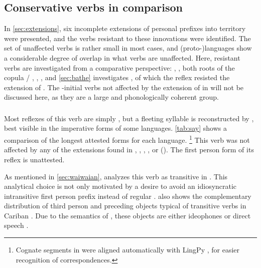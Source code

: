 \subsection{Conservative verbs in comparison}
\label{sec:verbs}
In \cref{sec:extensions}, six incomplete extensions of personal prefixes into  territory were presented, and the verbs resistant to these innovations were identified.
The set of unaffected verbs is rather small in most cases, and (proto-)languages show a considerable degree of overlap in what verbs are unaffected.
Here,  resistant verbs are investigated from a comparative perspective:
  ,   , both roots of the copula / ,   ,    , and  \cref{sec:bathe} investigates  , of which the \PPek reflex  resisted the extension of .
The -initial verbs not affected by the extension of  in \akuriyo {} will not be discussed here, as they are a large and phonologically coherent group.

\subsubsection{ }
\label{sec:say}
Most reflexes of this verb are simply , but a fleeting syllable  is reconstructed by \textcite{gildea2007greenberg}, best visible in the imperative forms of some languages.%
%
%
\cref{tab:say} shows a comparison of the longest attested forms for each language.%
\footnote{Cognate segments in  were aligned automatically with LingPy \parencite{lingpy268}, for easier recognition of correspondences.}
%
%
%
This verb was not affected by any of the extensions found in \PPek, \PWai, \PTir, \akuriyo, or \carijo ().
The first person form of its \yukpa reflex  is unattested.

As mentioned in \cref{sec:waiwaian}, \textcite{hixkaryanaderby1985} analyzes this verb as transitive in \hixka.
This analytical choice is not only motivated by a desire to avoid an idiosyncratic intransitive first person prefix  instead of regular .
\hixka {} also shows the complementary distribution of third person   and preceding objects typical of transitive verbs in Cariban \parencite[60--81]{gildea1998}.
Due to the semantics of , these objects are either ideophones or direct speech .

